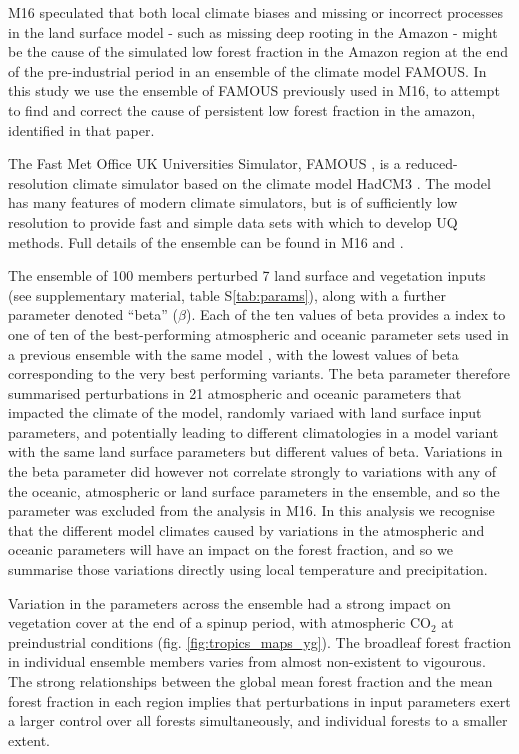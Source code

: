 \documentclass[gmd, manuscript]{copernicus}
\begin{document}
M16 speculated that both local climate biases and missing or incorrect processes in the land surface model - such as missing deep rooting in the Amazon - might be the cause of the simulated low forest fraction in the Amazon region at the end of the pre-industrial period in an ensemble of the climate model FAMOUS. In this study we use the ensemble of FAMOUS previously used in M16, to attempt to find and correct the cause of persistent low forest fraction in the amazon, identified in that paper. 

The Fast Met Office UK Universities Simulator, FAMOUS \citep{jones2005systematic, smith2008famous}, is a reduced-resolution climate simulator based on the climate model HadCM3 \citep{gordon2000simulation, pope2000impact}. The model has many features of modern climate simulators, but is of sufficiently low resolution to provide fast and simple data sets with which to develop UQ methods. Full details of the ensemble can be found in M16 and \cite{williams2013optimising}.

The ensemble of 100 members perturbed 7 land surface and vegetation inputs (see supplementary material, table S\ref{tab:params}), along with a further parameter denoted ``beta'' ($\beta$). Each of the ten values of beta provides a index to one of ten of the best-performing atmospheric and oceanic parameter sets used in a previous ensemble with the same model \cite{gregoire2010optimal}, with the lowest values of beta corresponding to the very best performing variants. The beta parameter therefore summarised perturbations in 21 atmospheric and oceanic parameters that impacted the climate of the model, randomly variaed with land surface input parameters, and potentially leading to different climatologies in a model variant with the same land surface parameters but different values of beta. Variations in the beta parameter did however not correlate strongly to variations with any of the oceanic, atmospheric or land surface parameters in the ensemble, and so the parameter was excluded from the analysis in M16. In this analysis we recognise that the different model climates caused by variations in the atmospheric and oceanic parameters will have an impact on the forest fraction, and so we summarise those variations directly using local temperature and precipitation.

Variation in the parameters across the ensemble had a strong impact on vegetation cover at the end of a spinup period, with atmospheric CO$_2$ at preindustrial conditions (fig. \ref{fig:tropics_maps_yg}). The broadleaf forest fraction in individual ensemble members varies from almost non-existent to vigourous. The strong relationships between the global mean forest fraction and the mean forest fraction in each region implies that perturbations in input parameters exert a larger control over all forests simultaneously, and individual forests to a smaller extent.
\end{document}
